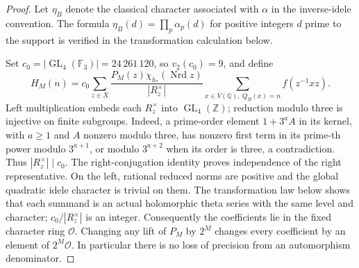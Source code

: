 \documentclass[11pt]{article}
\theoremstyle{definition}
\theoremstyle{remark}
\begin{document}
\begin{proof}
Let $\eta_B$ denote the classical character associated with $\alpha$
in the inverse-idele convention.  The formula
$\eta_B(d)=\prod_p\alpha_p(d)$ for positive integers $d$ prime to
the support is verified in the transformation calculation below.

Set $c_0=|\operatorname{GL}_4(\mathbb F_3)|=24\,261\,120$,
so $v_2(c_0)=9$, and define
\[
 H_M(n)=c_0\sum_{z\in X}
 \frac{P_M(z)\chi_{h_*}(\operatorname{Nrd}z)}{|R_z^\times|}
       \sum_{x\in V(\mathbb Q),\ Q_B(x)=n}f(z^{-1}xz). \tag{O.4}
\]
Left multiplication embeds each $R_z^\times$ into
$\operatorname{GL}_4(\mathbb Z)$; reduction modulo three is
injective on finite subgroups.  Indeed, a prime-order element
$1+3^aA$ in its kernel, with $a\geq1$ and $A$ nonzero modulo three,
has nonzero first term in its prime-th power modulo $3^{a+1}$,
or modulo $3^{a+2}$ when its order is three, a contradiction.
Thus $|R_z^\times|\mid c_0$.
The right-conjugation identity proves independence of the right
representative.  On the left, rational reduced norms are positive
and the global quadratic idele character is trivial on them.
The transformation law below shows that each summand is an actual
holomorphic theta series with the same level and character;
$c_0/|R_z^\times|$ is an integer.
Consequently the coefficients lie in the fixed character ring
$\mathcal O$.  Changing any lift of $P_M$ by $2^M$ changes every
coefficient by an element of $2^M\mathcal O$.  In particular
there is no loss of precision from an automorphism denominator.


\end{proof}
\end{document}
